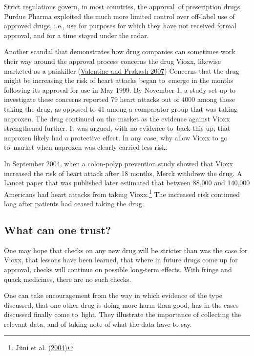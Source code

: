 \documentclass[
  10pt,
  b5paper]{book}
\begin{document}
Strict regulations govern, in most countries, the approval~of
prescription drugs. Purdue Pharma exploited the much more
limited control over off-label use of approved drugs, i.e.,
use for purposes for which they have not received formal
approval, and for a time stayed under the radar.

Another scandal that demonstrates how drug companies can
sometimes work their way around the approval process
concerns the drug Vioxx, likewise marketed as a
painkiller.(\protect\hyperlink{ref-valentine2007timeline}{Valentine and Prakash 2007}) Concerns that the
drug might be increasing the risk of heart attacks began
to~emerge in the months following its approval for use
in May 1999. By November 1, a study set up to investigate
these concerns reported 79 heart attacks out of 4000
among those taking the drug, as opposed to 41 among a
comparator group that was taking naproxen. The drug
continued on the market as the evidence against Vioxx
strengthened further. It was argued, with no evidence
to~back this up, that naproxen likely had a protective
effect. In any case, why allow Vioxx to go to~market
when naproxen was clearly carried less risk.

In September 2004,
when a colon-polyp prevention study showed that Vioxx
increased the risk of heart attack after 18 months,
Merck withdrew the drug. A Lancet paper that was
published later estimated that between 88,000 and
140,000 Americans had heart attacks from taking
Vioxx.\footnote{Jüni et al. (\protect\hyperlink{ref-juni2004risk}{2004})} The increased risk continued
long after patients had ceased taking the drug.

\hypertarget{what-can-one-trust}{%
\subsection*{What can one trust?}\label{what-can-one-trust}}

One may hope that checks on any new drug will be
stricter than was the case for Vioxx, that lessons
have been learned, that where in future drugs come
up for approval, checks will continue on possible
long-term effects. With fringe and quack medicines,
there are no such checks.

One can take encouragement from the way in which
evidence of the type discussed, that one other drug
is doing more harm than good, has in the cases
discussed finally come to~light. They illustrate
the importance of collecting the relevant data, and
of taking note of what the data have to say.
\end{document}
